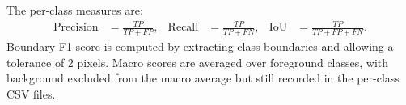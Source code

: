The per-class measures are:
\begin{align}
\mathrm{Precision} &= \frac{TP}{TP + FP}, &
\mathrm{Recall} &= \frac{TP}{TP + FN}, &
\mathrm{IoU} &= \frac{TP}{TP + FP + FN}.
\end{align}
Boundary F1-score is computed by extracting class boundaries and allowing a tolerance of 2 pixels. Macro scores are averaged over foreground classes, with background excluded from the macro average but still recorded in the per-class CSV files.
